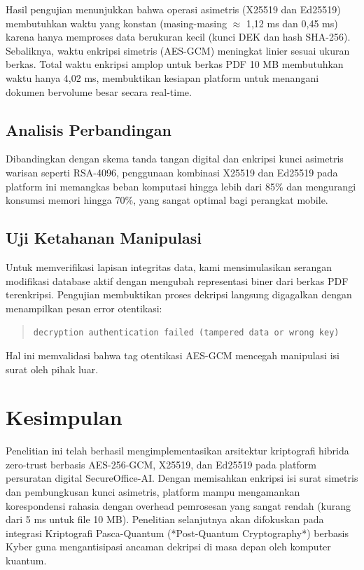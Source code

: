 \documentclass[conference]{IEEEtran}
\begin{document}
Hasil pengujian menunjukkan bahwa operasi asimetris (X25519 dan Ed25519) membutuhkan waktu yang konstan (masing-masing $\approx$ 1,12 ms dan 0,45 ms) karena hanya memproses data berukuran kecil (kunci DEK dan hash SHA-256). Sebaliknya, waktu enkripsi simetris (AES-GCM) meningkat linier sesuai ukuran berkas. Total waktu enkripsi amplop untuk berkas PDF 10 MB membutuhkan waktu hanya 4,02 ms, membuktikan kesiapan platform untuk menangani dokumen bervolume besar secara real-time.

\subsection{Analisis Perbandingan}
Dibandingkan dengan skema tanda tangan digital dan enkripsi kunci asimetris warisan seperti RSA-4096, penggunaan kombinasi X25519 dan Ed25519 pada platform ini memangkas beban komputasi hingga lebih dari 85\% dan mengurangi konsumsi memori hingga 70\%, yang sangat optimal bagi perangkat mobile.

\subsection{Uji Ketahanan Manipulasi}
Untuk memverifikasi lapisan integritas data, kami mensimulasikan serangan modifikasi database aktif dengan mengubah representasi biner dari berkas PDF terenkripsi. Pengujian membuktikan proses dekripsi langsung digagalkan dengan menampilkan pesan error otentikasi:
\begin{quote}
\texttt{decryption authentication failed (tampered data or wrong key)}
\end{quote}
Hal ini memvalidasi bahwa tag otentikasi AES-GCM mencegah manipulasi isi surat oleh pihak luar.

\section{Kesimpulan}
Penelitian ini telah berhasil mengimplementasikan arsitektur kriptografi hibrida zero-trust berbasis AES-256-GCM, X25519, dan Ed25519 pada platform persuratan digital SecureOffice-AI. Dengan memisahkan enkripsi isi surat simetris dan pembungkusan kunci asimetris, platform mampu mengamankan korespondensi rahasia dengan overhead pemrosesan yang sangat rendah (kurang dari 5 ms untuk file 10 MB). Penelitian selanjutnya akan difokuskan pada integrasi Kriptografi Pasca-Quantum (*Post-Quantum Cryptography*) berbasis Kyber guna mengantisipasi ancaman dekripsi di masa depan oleh komputer kuantum.
\end{document}
